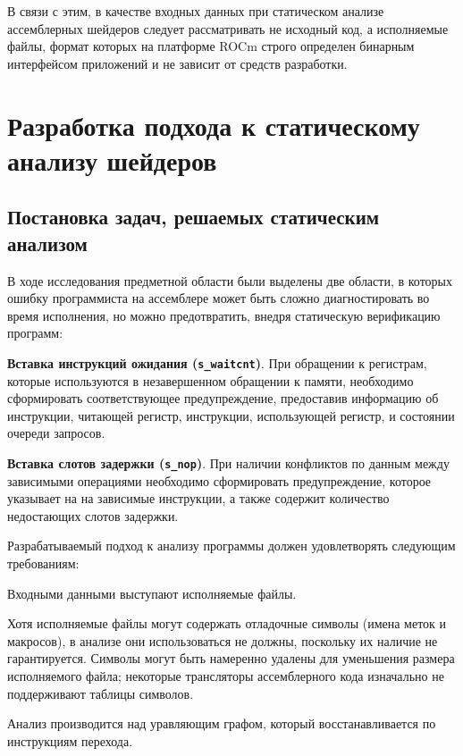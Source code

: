 \documentclass[a4paper,14pt]{extarticle}
\begin{document}
{В связи с этим, в качестве входных данных при статическом анализе ассемблерных шейдеров
следует рассматривать не исходный код, а исполняемые файлы, формат которых
на платформе ROCm строго определен бинарным интерфейсом приложений \cite{amdgpu-abi} и не
зависит от средств разработки. 

\newpage
\section{Разработка подхода к статическому анализу шейдеров}
\label{section:algorithms}

\subsection{Постановка задач, решаемых статическим анализом}

В ходе исследования предметной области были выделены две области, в которых ошибку программиста
на ассемблере может быть сложно диагностировать во время исполнения, но можно
предотвратить, внедря статическую верификацию программ:
\begin{ol}
\item \textbf{Вставка инструкций ожидания (\texttt{s\_waitcnt})}. При обращении к регистрам,
которые используются в незавершенном обращении к памяти, необходимо сформировать соответствующее
предупреждение, предоставив информацию об инструкции, читающей регистр, инструкции,
использующей регистр, и состоянии очереди запросов.
\item \textbf{Вставка слотов задержки (\texttt{s\_nop})}. При наличии конфликтов по данным
между зависимыми операциями необходимо сформировать предупреждение, которое указывает на
на зависимые инструкции, а также содержит количество недостающих слотов задержки.
\end{ol}

Разрабатываемый подход к анализу программы должен удовлетворять следующим требованиям:

\begin{ul}
\item Входными данными выступают исполняемые файлы.
\item Хотя исполняемые файлы могут содержать отладочные символы (имена меток и макросов),
в анализе они использоваться не должны, поскольку их наличие не гарантируется. Символы могут быть
намеренно удалены для уменьшения размера исполняемого файла; некоторые трансляторы ассемблерного
кода изначально не поддерживают таблицы символов.
\item Анализ производится над уравляющим графом, который восстанавливается по инструкциям перехода.
\end{ul}

}
\end{document}
